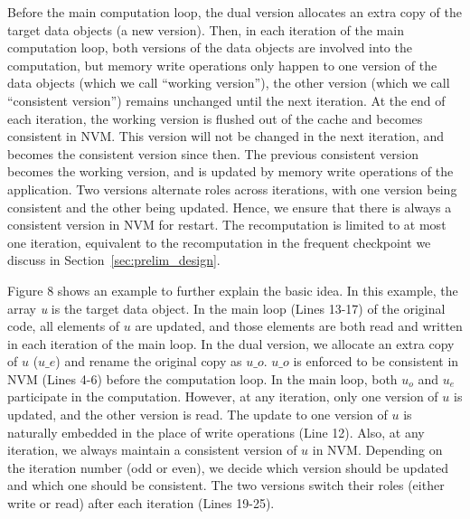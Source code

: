 Before the main computation loop, 
the dual version allocates an extra copy of the target data objects (a new version). Then, in each iteration of the main computation loop, both versions of the data objects are involved into the computation, but memory write operations only happen to one version of the data objects (which we call ``working version''),
the other version (which we call ``consistent version'')%
 remains unchanged until the next iteration.
At the end of each iteration, the working version 
is flushed out of the cache and becomes consistent in NVM. 
This version will not be changed in the next iteration, and 
becomes the consistent version since then.
The previous consistent version becomes the working version,
and is updated by memory write operations of the application.
Two versions alternate roles across iterations, with one version being consistent and the other being updated.
Hence, we ensure that there is always a consistent version in NVM for restart.
The recomputation is limited to at most one iteration, equivalent
to the recomputation in the frequent checkpoint we discuss in Section~\ref{sec:prelim_design}.

Figure 8 shows an example %
to further explain the basic idea. In this example, the array \textit{u} is the target data object. %
In the main loop (Lines 13-17) of the original code, all elements of $u$ are updated, and those elements are both read and written in each iteration of the main loop. 
In the dual version, 
we allocate an extra copy of $u$ ($u\_e$) and rename the original copy as $u\_o$. 
$u\_o$ is enforced to be consistent in NVM (Lines 4-6) before the computation loop. 
In the main loop, both $u_o$ and $u_e$ participate in
the computation. 
However, at any iteration, only one version of $u$
is updated, and the other version is read.
The update to one version of $u$ is naturally embedded
in the place of write operations (Line 12).
Also, at any iteration, we always maintain a consistent version of $u$ in NVM.
Depending on the iteration number (odd or even), we decide
which version should be updated and which one should be consistent.
The two versions switch their roles (either write or read) after each iteration (Lines 19-25).

